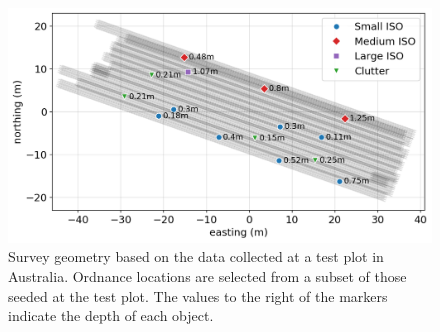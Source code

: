 \begin{figure}[htb]
\vspace{-0.1cm}
    \begin{center}
    \includegraphics[width=\columnwidth]{figures/synthetic-test-plot.png}
    \end{center}
    \vspace{-0.5cm}
\caption{
    Survey geometry based on the data collected at a test plot in Australia.
    Ordnance locations are selected from a subset of those seeded at the test plot.
    The values to the right of the markers indicate the depth of each object.
}
\label{fig:synthetic-test-plot}
\vspace{-0.1cm}
\end{figure}
